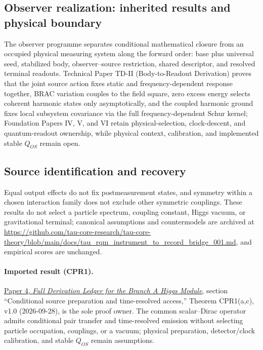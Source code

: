 \documentclass[11pt]{article}
\begin{document}
\subsection{Observer realization: inherited results and physical boundary}
\label{sec:observer-update-20260914}
The observer programme separates conditional mathematical closure from an occupied physical measuring system along the forward order: base plus universal seed, stabilized body, observer--source restriction, shared descriptor, and resolved terminal readouts. Technical Paper TD-II (Body-to-Readout Derivation) proves that the joint source action fixes static and frequency-dependent response together, BRAC variation couples to the field square, zero excess energy selects coherent harmonic states only asymptotically, and the coupled harmonic ground fixes local subsystem covariance via the full frequency-dependent Schur kernel; Foundation Papers IV, V, and VI retain physical-selection, clock-descent, and quantum-readout ownership, while physical context, calibration, and implemented stable $Q_{OS}$ remain open.

\subsection{Source identification and recovery}
Equal output effects do not fix postmeasurement states, and symmetry within a chosen interaction family does not exclude other symmetric couplings. These results do not select a particle spectrum, coupling constant, Higgs vacuum, or gravitational terminal; canonical assumptions and countermodels are archived at \url{https://github.com/tau-core-research/tau-core-theory/blob/main/docs/tau_rqm_instrument_to_record_bridge_001.md}, and empirical scores are unchanged.

\paragraph{Imported result (CPR1).}
\href{https://github.com/tau-core-research/tau-core-higgs-module-paper4/blob/main/paper4_full_derivation/full_derivation.pdf#nameddest=cpr1}{Paper 4, \emph{Full Derivation Ledger for the Branch A Higgs Module}}, section ``Conditional source preparation and time-resolved access,'' Theorem CPR1(a,c), v1.0 (2026-09-28), is the sole proof owner.
The common scalar--Dirac operator admits conditional pair transfer and time-resolved emission without selecting particle occupation, couplings, or a vacuum; physical preparation, detector/clock calibration, and stable $Q_{OS}$ remain assumptions.
\end{document}
